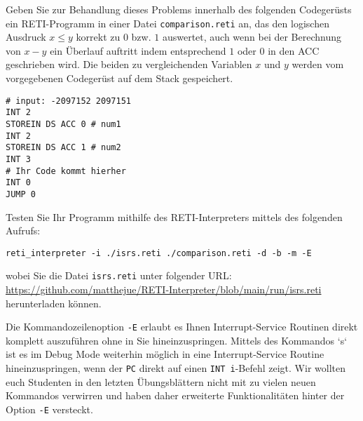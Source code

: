\documentclass{article}
\begin{document}
Geben Sie zur Behandlung dieses Problems innerhalb des folgenden Codegerüsts ein RETI-Programm in einer Datei \verb|comparison.reti| an, das den logischen Ausdruck $x \le y$ korrekt zu $0$ bzw. $1$ auswertet, auch wenn bei der Berechnung von $x - y$ ein Überlauf auftritt indem entsprechend $1$ oder $0$ in den ACC geschrieben wird. Die beiden zu vergleichenden Variablen $x$ und $y$ werden vom vorgegebenen Codegerüst auf dem Stack gespeichert. %

\begin{verbatim}
# input: -2097152 2097151
INT 2
STOREIN DS ACC 0 # num1
INT 2
STOREIN DS ACC 1 # num2
INT 3
# Ihr Code kommt hierher 
INT 0
JUMP 0
\end{verbatim}

Testen Sie Ihr Programm mithilfe des RETI-Interpreters mittels des folgenden Aufrufs:

\begin{verbatim}
reti_interpreter -i ./isrs.reti ./comparison.reti -d -b -m -E
\end{verbatim}

wobei Sie die Datei \verb|isrs.reti| unter folgender URL: \href{https://github.com/matthejue/RETI-Interpreter/blob/main/run/isrs.reti}{https://github.com/matthejue/RETI-Interpreter/blob/main/run/isrs.reti} herunterladen können.

Die Kommandozeilenoption \verb|-E| erlaubt es Ihnen Interrupt-Service Routinen direkt komplett auszuführen ohne in Sie hineinzuspringen. Mittels des Kommandos `s` ist es im Debug Mode weiterhin möglich in eine Interrupt-Service Routine hineinzuspringen, wenn der \verb|PC| direkt auf einen \verb|INT i|-Befehl zeigt. Wir wollten euch Studenten in den letzten Übungsblättern nicht mit zu vielen neuen Kommandos verwirren und haben daher erweiterte Funktionalitäten hinter der Option \verb|-E| versteckt.
\end{document}
